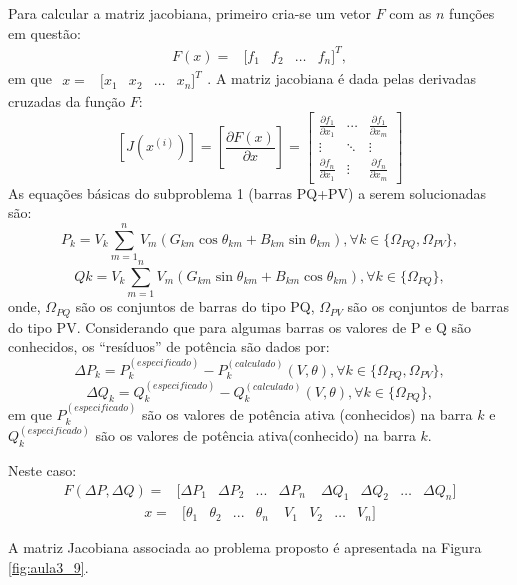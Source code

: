 Para calcular a matriz jacobiana, primeiro cria-se um vetor $F$ com as $n$ funções em questão:
\[
\begin{matrix} 
F(x)= & [f_{ 1 } & { f }_{ 2 } & \dots & { f }_{ n }{ ] }^{ T }, 
\end{matrix}
\]
em que $\begin{matrix} 
x= & [x_{ 1 } & { x }_{ 2 } & \dots & { x }_{ n }{ ] }^{ T } 
\end{matrix}$. A matriz jacobiana é dada pelas derivadas cruzadas da função $F$:
\[
	\left[J(x^{(i)})\right]=\left[\frac{\partial F(x)}{\partial x}\right]=\left[\begin{array}{ccc}
	\frac{\partial f_{1}}{\partial x_{1}} & \cdots & \frac{\partial f_{1}}{\partial x_{m}}\\
	\vdots & \ddots & \vdots\\
	\frac{\partial f_{n}}{\partial x_{1}} & \vdots & \frac{\partial f_{n}}{\partial x_{m}}
	\end{array}\right]
\]
As equações básicas do subproblema 1 (barras PQ+PV) a serem solucionadas
são:
\[
P_{k}=V_{k}\sum_{m=1}^{n}V_{m}(G_{km}\cos\theta_{km}+B_{km}\sin\theta_{km}),\forall k\in\{\Omega_{PQ},\Omega_{PV}\},
\]
\[
Qk=V_{k}\sum_{m=1}^{n}V_{m}(G_{km}\sin\theta_{km}+B_{km}\cos\theta_{km}),\forall k\in\{\Omega_{PQ}\},
\]
onde, $\Omega_{PQ}$ são os conjuntos de barras do tipo PQ, $\Omega_{PV}$ são os conjuntos de barras do tipo PV. Considerando que para algumas barras os valores de P e Q são conhecidos, os ``resíduos'' de potência são dados por:
\[
\Delta P_{k}=P_{k}^{(especificado)}-P_{k}^{(calculado)}(V,\theta),\forall k\in\{\Omega_{PQ},\Omega_{PV}\},
\]
\[
\Delta Q_{k}=Q_{k}^{(especificado)}-Q_{k}^{(calculado)}(V,\theta),\forall k\in\{\Omega_{PQ}\},
\]
em que $P_{k}^{(especificado)}$ são os valores de potência ativa (conhecidos) na
barra $k$ e $Q_{k}^{(especificado)}$ são os valores de potência ativa(conhecido) na barra $k$.

Neste caso: 
\[
	\begin{matrix}
	F(\Delta { P },\Delta Q)= & [\Delta { P }_{ 1 } & \Delta { P }_{ 2 } & ... & \Delta { P }_{ n }^{ \quad } & \Delta { Q }_{ 1 } & \Delta { Q }_{ 2 } & \dots & { \Delta { Q } }_{ n }] 
	\end{matrix}
\]
\[
	\begin{matrix} 
	x= & [\theta _{ 1 } & \theta _{ 2 } & ... & \theta _{ n }^{ \quad } & V_{ 1 } & V_{ 2 } & \dots & { V }_{ n }] 
	\end{matrix}
\]

A matriz Jacobiana associada ao problema proposto é apresentada na Figura \ref{fig:aula3_9}.


